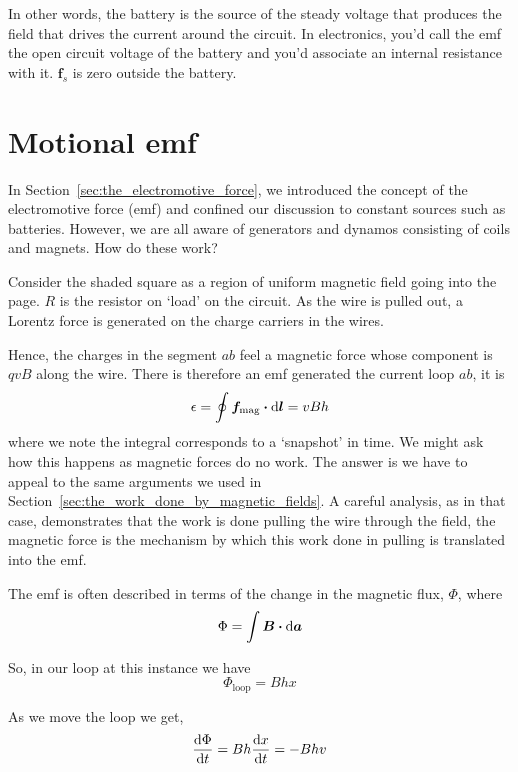 \documentclass[12pt,chapterprefix=false,dvipsnames]{scrbook}
\theoremstyle{dotless}
\theoremstyle{definition}
\begin{document}
In other words, the battery is the source of the steady voltage
that produces the field that drives the current around the
circuit. In electronics, you'd call the emf the open circuit
voltage of the battery and you'd associate an internal
resistance with it. $\bm{f}_s$ is zero outside the
battery.

\section{Motional emf}%
\label{sec:motional_emf}

In Section~\ref{sec:the_electromotive_force}, we introduced the concept
of the electromotive force (emf) and confined our discussion to
constant sources such as batteries. However, we are all aware of
generators and dynamos consisting of coils and magnets. How do
these work?

Consider the shaded square as a region of uniform magnetic field
going into the page. $R$ is the resistor on
`load' on the circuit. As the wire is pulled out, a Lorentz
force is generated on the charge carriers in the wires.

Hence, the charges in the segment $ab$ feel a
magnetic force whose component is $qvB$ along
the wire. There is therefore an emf generated the current loop
$ab$, it is
\begin{equation}
	\label{eq:intermediary_motional_ef}
	\epsilon =
	\oint\bm{f}_{\mathrm{mag}}\vdot\dd{\bm{l}}
	=
	vBh
\end{equation}
where we note the integral corresponds to a `snapshot' in time.
We might ask how this happens as magnetic forces do no work. The
answer is we have to appeal to the same arguments we used in
Section~\ref{sec:the_work_done_by_magnetic_fields}. A careful analysis, as in that
case, demonstrates that the work is done pulling the wire
through the field, the magnetic force is the mechanism by which
this work done in pulling is translated into the emf.

The emf is often described in terms of the change in the
magnetic flux, $\Phi$, where
\begin{equation}
	\Phi = \int\bm{B}\vdot\dd{\bm{a}}
\end{equation}

So, in our loop at this instance we have
\begin{equation}
	\Phi_{\mathrm{loop}}
	=
	Bhx
\end{equation}

As we move the loop we get,
\begin{equation}
	\dv{\Phi}{t} = Bh\dv{x}{t} = -Bhv
\end{equation}
\end{document}
